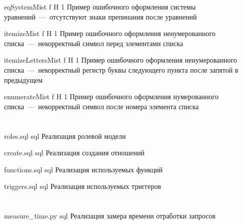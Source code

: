\begin{appendices}
	{eqSystemMist} %
	{f} %
	{H} %
	{1\textwidth} %
	{Пример ошибочного оформления системы уравнений~---~отсутствуют знаки препинания после уравнений} %
	
	{itemizeMist} %
	{f} %
	{H} %
	{1\textwidth} %
	{Пример ошибочного оформления ненумерованного списка~---~некорректный символ перед элементами списка} %
	
	{itemizeLettersMist} %
	{f} %
	{H} %
	{1\textwidth} %
	{Пример ошибочного оформления ненумерованного списка~---~некорректный регистр буквы следующего пункта после запятой в предыдущем} %
	
	{enumerateMist} %
	{f} %
	{H} %
	{1\textwidth} %
	{Пример ошибочного оформления нумерованного списка~---~некорректный символ после номера элемента списка} %
	
	
	\chapter{}
	{roles.sql} %
	{sql} %
	{Реализация ролевой модели} %
	
	{create.sql} %
	{sql} %
	{Реализация создания отношений} %
	
	{functions.sql} %
	{sql} %
	{Реализация используемых функций} %
	
	{triggers.sql} %
	{sql} %
	{Реализация используемых триггеров} %
	
	\chapter{}
	{measure_time.py} %
	{sql} %
	{Реализация замера времени отработки запросов} %
	
	
	
	
	
\end{appendices}
	
	
